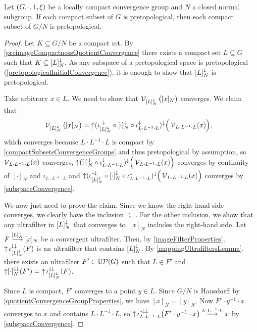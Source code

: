 \begin{lemma} \label{compactSubsetsQuotientGroupPretopological}
Let $\sSet{G, \cdot, 1, \xi}$ be a locally compact convergence group and $N$ a closed normal subgroup. If each compact subset of $G$ is pretopological, then each compact subset of $G/N$ is pretopological.
\end{lemma}
\begin{proof}
Let $K\subseteq G/N$ be a compact set. By \ref{preimageCompactnessQuotientConvergence} there exists a compact set $L\subseteq G$ such that $K\subseteq [L]_N^\downarrow$. As any subspace of a pretopological space is pretopological (\ref{pretopologicalInitialConvergence}), it is enough to show that $[L]_N^\downarrow$ is pretopological.

Take arbitrary $x\in L$. We need to show that $\operatorname{\mathcal{V}}_{[L]_N^\downarrow}\big([x]_N\big)$ converges. We claim that
\[ \operatorname{\mathcal{V}}_{[L]_N^\downarrow}\big([x]_N\big) = \operatorname{\uparrow} (\iota^{{\text{\hspace{0.15em}-}\downarrow}}_{[L]_N^\downarrow} \circ [\cdot]_N^\downarrow\circ \iota_{L\cdot L^{-1}\cdot L}^\downarrow)^{\downarrow}\Big(\operatorname{\mathcal{V}}_{L\cdot L^{-1}\cdot L}(x)\Big), \]
which converges because $L\cdot L^{-1}\cdot L$ is compact by \ref{compactSubsetsConvergenceGroups} and thus pretopological by assumption, so $\operatorname{\mathcal{V}}_{L\cdot L^{-1}\cdot L}(x)$ converges, $\operatorname{\uparrow} ([\cdot]_N^\downarrow\circ \iota_{L\cdot L^{-1}\cdot L}^\downarrow)^{\downarrow}\Big(\operatorname{\mathcal{V}}_{L\cdot L^{-1}\cdot L}(x)\Big)$ converges by continuity of $[\cdot]_N$ and $\iota_{L\cdot L^{-1}\cdot L}$ and $\operatorname{\uparrow} (\iota^{{\text{\hspace{0.15em}-}\downarrow}}_{[L]_N^\downarrow} \circ [\cdot]_N^\downarrow\circ \iota_{L\cdot L^{-1}\cdot L}^\downarrow)^{\downarrow}\Big(\operatorname{\mathcal{V}}_{L\cdot L^{-1}\cdot L}(x)\Big)$ converges by \ref{subspaceConvergence}.

We now just need to prove the claim. Since we know the right-hand side converges, we clearly have the inclusion $\subseteq$. For the other inclusion, we show that any ultrafilter in $[L]_N^\downarrow$ that converges to $[x]_N$ includes the right-hand side. Let $F\overset{[L]_N^\downarrow}{\longrightarrow} [x]_N$ be a convergent ultrafilter. 
Then, by \ref{imageFilterProperties},  $\operatorname{\uparrow}\iota_{[L]_N^\downarrow}^{\downarrow\downarrow}(F)$ is an ultrafilter that contains $[L]_N^\downarrow$.
By \ref{mappingUltrafiltersLemma}, there exists an ultrafilter $F'\in \operatorname{\mathbb{U}\mathcal{P}}(G)$ such that $L\in F'$ and $\operatorname{\uparrow}[\cdot]_N^{\downarrow\downarrow}(F') = \operatorname{\uparrow}\iota_{[L]_N^\downarrow}^{\downarrow\downarrow}(F)$.

Since $L$ is compact, $F'$ converges to a point $y\in L$. Since $G/N$ is Hausdorff by \ref{quotientConvergenceGroupProperties}, we have $[x]_N = [y]_N$. Now $F'\cdot y^{-1}\cdot x$ converges to $x$ and contains $L\cdot L^{-1}\cdot L$, so $\operatorname{\uparrow}\iota_{L\cdot L^{-1}\cdot L}^{{\text{\hspace{0.15em}-}\downarrow}\downarrow}\big(F'\cdot y^{-1}\cdot x\big) \overset{L\cdot L^{-1}\cdot L}{\longrightarrow} x$ by \ref{subspaceConvergence}.


\end{proof}
